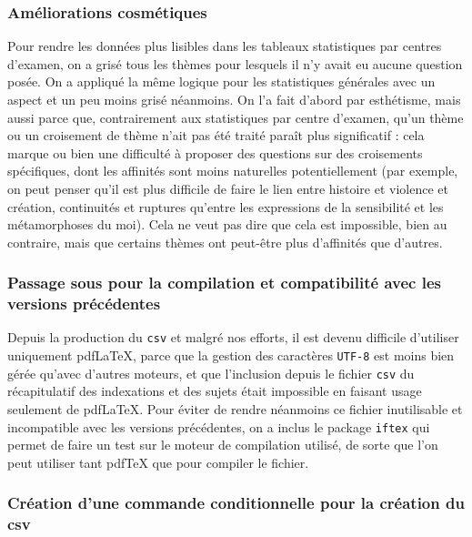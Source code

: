\subsubsection{Améliorations cosmétiques}

Pour rendre les données plus lisibles dans les tableaux statistiques par centres d'examen, on a grisé tous les thèmes pour lesquels il n'y avait eu aucune question posée. On a appliqué la même logique pour les statistiques générales avec un aspect et un peu moins grisé néanmoins. On l'a fait d'abord par esthétisme, mais aussi parce que, contrairement aux statistiques par centre d'examen, qu'un thème ou un croisement de thème n'ait pas été traité paraît plus significatif : cela marque ou bien une difficulté à proposer des questions sur des croisements spécifiques, dont les affinités sont moins naturelles potentiellement (par exemple, on peut penser qu'il est plus difficile de faire le lien entre histoire et violence et création, continuités et ruptures qu'entre les expressions de la sensibilité et les métamorphoses du moi). Cela ne veut pas dire que cela est impossible, bien au contraire, mais que certains thèmes ont peut-être plus d'affinités que d'autres.

\subsubsection{Passage sous \XeLaTeX{} pour la compilation et compatibilité avec les versions précédentes}

Depuis la production du \texttt{csv} et malgré nos efforts, il est devenu difficile d'utiliser uniquement pdf\LaTeX{}, parce que la gestion des caractères \texttt{UTF-8} est moins bien gérée qu'avec d'autres moteurs, et que l'inclusion depuis le fichier \texttt{csv} du récapitulatif des indexations et des sujets était impossible en faisant usage seulement de pdf\LaTeX{}. Pour éviter de rendre néanmoins ce fichier inutilisable et incompatible avec les versions précédentes, on a inclus le package \texttt{iftex} qui permet de faire un test sur le moteur de compilation utilisé, de sorte que l'on peut utiliser tant pdf\TeX{} que \XeTeX{} pour compiler le fichier.

\subsubsection{Création d'une commande conditionnelle pour la création du csv}

